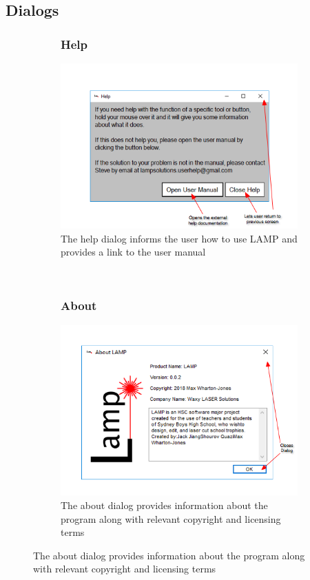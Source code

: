 \documentclass[oneside,openany,11pt,a4paper]{report}
\begin{document}
\subsection{Dialogs}
\begin{figure}[H]
	\begin{subfigure}[t]{0.3\textwidth}
\subsubsection{Help}

	\centering
	
	\includegraphics[width=\textwidth]{screen/help.png}
	\caption{The help dialog informs the user how to use LAMP and provides a link to the user manual}
	\end{subfigure}
~
\begin{subfigure}[t]{0.3\textwidth}
	\subsubsection{About}

	\centering

	\includegraphics[width=\textwidth]{screen/about.png}
	\caption{The about dialog provides information about the program along with relevant copyright and licensing terms}


\end{subfigure}
\end{figure}
\end{document}
